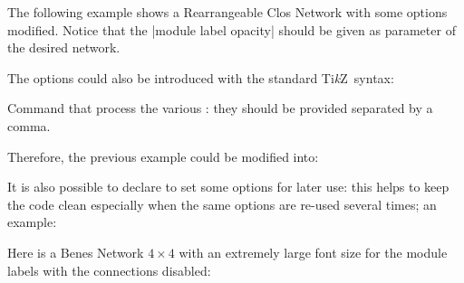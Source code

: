 \documentclass{ltxdoc} %
\newcommand\Tikz{Ti\textit kZ}
\begin{document}
The following example shows a Rearrangeable Clos Network with some options modified. Notice that the |module label opacity| should be given as parameter of the desired network.

\begin{codeexample}[]
\begin{tikzpicture}[N=9,r1=3,M=9,r3=3]
    \node[module size=0.5cm,pin length factor=0.5,
        module ysep=1, module xsep=1.25,
        clos rear={module label opacity=0}] {};
\end{tikzpicture}
\end{codeexample}

The options could also be introduced with the standard \Tikz\ syntax:
\begin{command}{{\tikzset}}
    Command that process the various : they should be provided separated by a comma.
\end{command}


Therefore, the previous example could be modified into:
\begin{codeexample}[]
\tikzset{module size=0.5cm,pin length factor=0.5,
         module ysep=1, module xsep=1.25,}
\begin{tikzpicture}[N=9,r1=3,M=9,r3=3]
    \node[clos rear={module label opacity=0}] {};
\end{tikzpicture}
\end{codeexample}

It is also possible to declare  to set some options for later use: this helps to keep the code clean especially when the same options are re-used several times; an example:
\begin{codeexample}
\tikzset{module size definition, 
 P=16,
}
\begin{tikzpicture}
    \node[benes] {};
\end{tikzpicture}
\end{codeexample}

Here is a Benes Network $4 \times 4$ with an extremely large font size for the module labels with the connections disabled:
\begin{codeexample}[]
\tikzset{my style, P=4, 
 module font=\huge\slshape, 
 connections disabled=true
}
\end{codeexample}
\end{document}
